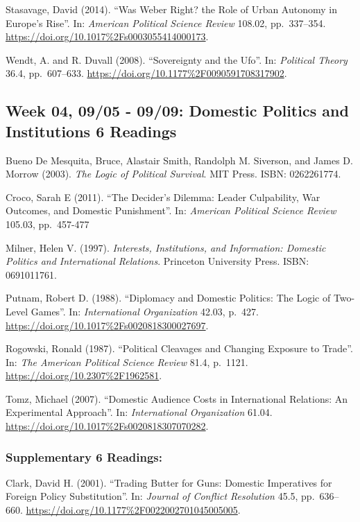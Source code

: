\documentclass[10pt,]{article}
\begin{document}
Stasavage, David (2014). ``Was Weber Right? the Role of Urban Autonomy
in Europe's Rise''. In: \emph{American Political Science Review} 108.02,
pp.~337--354. \url{https://doi.org/10.1017\%2Fs0003055414000173}.

Wendt, A. and R. Duvall (2008). ``Sovereignty and the Ufo''. In:
\emph{Political Theory} 36.4, pp.~607--633.
\url{https://doi.org/10.1177\%2F0090591708317902}.

\subsection{Week 04, 09/05 - 09/09: Domestic Politics and Institutions
\textbar{} 6
Readings}\label{week-04-0905---0909-domestic-politics-and-institutions-6-readings}

Bueno De Mesquita, Bruce, Alastair Smith, Randolph M. Siverson, and
James D. Morrow (2003). \emph{The Logic of Political Survival}. MIT
Press. ISBN: 0262261774.

Croco, Sarah E (2011). ``The Decider's Dilemma: Leader Culpability, War
Outcomes, and Domestic Punishment''. In:
\emph{American Political Science Review} 105.03, pp.~457-477

Milner, Helen V. (1997).
\emph{Interests, Institutions, and Information: Domestic Politics and International Relations}.
Princeton University Press. ISBN: 0691011761.

Putnam, Robert D. (1988). ``Diplomacy and Domestic Politics: The Logic
of Two-Level Games''. In: \emph{International Organization} 42.03,
p.~427. \url{https://doi.org/10.1017\%2Fs0020818300027697}.

Rogowski, Ronald (1987). ``Political Cleavages and Changing Exposure to
Trade''. In: \emph{The American Political Science Review} 81.4, p.~1121.
\url{https://doi.org/10.2307\%2F1962581}.

Tomz, Michael (2007). ``Domestic Audience Costs in International
Relations: An Experimental Approach''. In:
\emph{International Organization} 61.04.
\url{https://doi.org/10.1017\%2Fs0020818307070282}.

\subsubsection{Supplementary \textbar{} 6
Readings:}\label{supplementary-6-readings-1}

Clark, David H. (2001). ``Trading Butter for Guns: Domestic Imperatives
for Foreign Policy Substitution''. In:
\emph{Journal of Conflict Resolution} 45.5, pp.~636--660.
\url{https://doi.org/10.1177\%2F0022002701045005005}.
\end{document}
